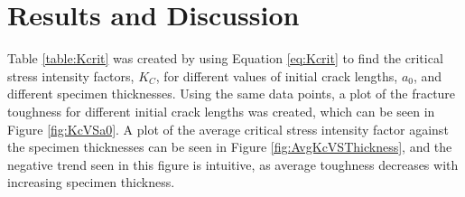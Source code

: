\section{Results and Discussion}

Table \ref{table:Kcrit} was created by using Equation \ref{eq:Kcrit} to find the critical stress intensity factors, $K_C$, for different values of initial crack lengths, $a_0$, and different specimen thicknesses. Using the same data points, a plot of the fracture toughness for different initial crack lengths was created, which can be seen in Figure \ref{fig:KcVSa0}. A plot of the average critical stress intensity factor against the specimen thicknesses can be seen in Figure \ref{fig:AvgKcVSThickness}, and the negative trend seen in this figure is intuitive, as average toughness decreases with increasing specimen thickness.

